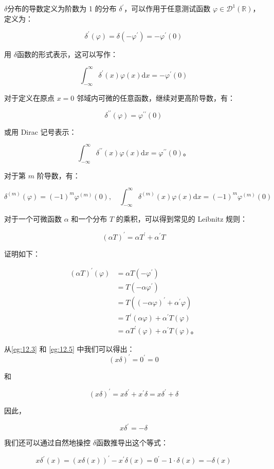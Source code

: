 \begin{eg}\label{eg:12.5} 
  $\delta$分布的导数定义为阶数为 1 的分布
$\delta^{\prime}$，可以作用于任意测试函数
$\varphi \in \mathcal{D}^1(\mathbb{R})$，定义为：

$$
\delta^{\prime}(\varphi) = \delta\left(-\varphi^{\prime}\right) = -\varphi^{\prime}(0)
$$

用 $\delta$函数的形式表示，这可以写作：

$$
\int_{-\infty}^\infty \delta^{\prime}(x) \varphi(x) \mathrm{d}x = -\varphi^{\prime}(0)
$$

对于定义在原点 $x=0$ 邻域内可微的任意函数，继续对更高阶导数，有：

$$
\delta^{\prime\prime}(\varphi) = \varphi^{\prime\prime}(0)
$$

或用 Dirac 记号表示：

$$
\int_{-\infty}^\infty \delta^{\prime\prime}(x) \varphi(x) \mathrm{d}x = \varphi^{\prime\prime}(0)。
$$

对于第 $m$ 阶导数，有：

$$
\delta^{(m)}(\varphi) = (-1)^m \varphi^{(m)}(0), \quad \int_{-\infty}^\infty \delta^{(m)}(x) \varphi(x) \mathrm{d}x = (-1)^m \varphi^{(m)}(0)
$$

对于一个可微函数 $\alpha$ 和一个分布 $T$ 的乘积，可以得到常见的
Leibnitz 规则：

$$
(\alpha T)^{\prime} = \alpha T^{\prime} + \alpha^{\prime} T
$$

证明如下：

$$
\begin{aligned}
(\alpha T)^{\prime}(\varphi) & = \alpha T\left(-\varphi^{\prime}\right) \\
& = T\left(-\alpha \varphi^{\prime}\right) \\
& = T\left((-\alpha \varphi)^{\prime} + \alpha^{\prime} \varphi\right) \\
& = T^{\prime}(\alpha \varphi) + \alpha^{\prime} T(\varphi) \\
& = \alpha T^{\prime}(\varphi) + \alpha^{\prime} T(\varphi)。
\end{aligned}
$$
\end{eg}
\begin{eg}\label{eg:12.6} 
  从\ref{eg:12.3} 和 \ref{eg:12.5} 中我们可以得出：
$$
(x \delta)^{\prime} = 0^{\prime} = 0
$$

和

$$
(x \delta)^{\prime} = x \delta^{\prime} + x^{\prime} \delta = x \delta^{\prime} + \delta
$$

因此，

$$
x \delta^{\prime} = -\delta
$$

我们还可以通过自然地操控 $\delta$函数推导出这个等式：

$$
x \delta^{\prime}(x) = (x \delta(x))^{\prime} - x^{\prime} \delta(x) = 0^{\prime} - 1 \cdot \delta(x) = -\delta(x)
$$
\end{eg}

